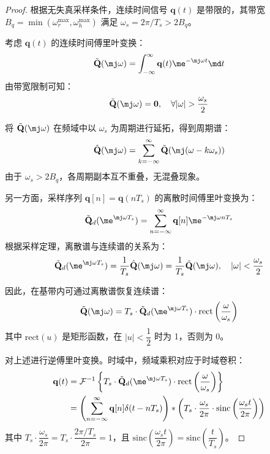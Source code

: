 \begin{proof}
    根据无失真采样条件，连续时间信号 $\mathbf{q}(t)$ 是带限的，其带宽 $B_q = \min(\omega_r^{\max}, \omega_h^{\max})$ 满足 $\omega_s = 2\pi/T_s > 2B_q$。

    考虑 $\mathbf{q}(t)$ 的连续时间傅里叶变换：
    \begin{equation}
        \tilde{\mathbf{Q}}(\mj\omega) = \int_{-\infty}^{\infty} \mathbf{q}(t) \me^{-\mj\omega t} \md t
    \end{equation}
    由带宽限制可知：
    \begin{equation}
        \tilde{\mathbf{Q}}(\mj\omega) = \mathbf{0}, \quad \forall |\omega| > \dfrac{\omega_s}{2}
    \end{equation}

    将 $\tilde{\mathbf{Q}}(\mj\omega)$ 在频域中以 $\omega_s$ 为周期进行延拓，得到周期谱：
    \begin{equation}
        \hat{\mathbf{Q}}(\mj\omega) = \sum_{k=-\infty}^{\infty} \tilde{\mathbf{Q}}(\mj(\omega - k \omega_s))
    \end{equation}
    由于 $\omega_s > 2B_q$，各周期副本互不重叠，无混叠现象。

    另一方面，采样序列 $\mathbf{q}[n] = \mathbf{q}(nT_s)$ 的离散时间傅里叶变换为：
    \begin{equation}
        \tilde{\mathbf{Q}}_d(\me^{\mj\omega T_s}) = \sum_{n=-\infty}^{\infty} \mathbf{q}[n] \me^{-\mj\omega nT_s}
    \end{equation}
    根据采样定理，离散谱与连续谱的关系为：
    \begin{equation}
        \tilde{\mathbf{Q}}_d(\me^{\mj\omega T_s}) = \dfrac{1}{T_s} \hat{\mathbf{Q}}(\mj\omega) = \dfrac{1}{T_s} \tilde{\mathbf{Q}}(\mj\omega), \quad |\omega| < \dfrac{\omega_s}{2}
    \end{equation}

    因此，在基带内可通过离散谱恢复连续谱：
    \begin{equation}
        \tilde{\mathbf{Q}}(\mj\omega) = T_s \cdot \tilde{\mathbf{Q}}_d(\me^{\mj\omega T_s}) \cdot \mathrm{rect}\left(\dfrac{\omega}{\omega_s}\right)
    \end{equation}
    其中 $\mathrm{rect}(u)$ 是矩形函数，在 $|u| < \dfrac{1}{2}$ 时为 1，否则为 0。

    对上述进行逆傅里叶变换。时域中，频域乘积对应于时域卷积：
    \begin{align*}
        \mathbf{q}(t) & = \mathcal{F}^{-1} \left\{ T_s \cdot \tilde{\mathbf{Q}}_d(\me^{\mj\omega T_s}) \cdot \mathrm{rect}\left(\dfrac{\omega}{\omega_s}\right) \right\}                             \\
                      & = \left( \sum_{n=-\infty}^{\infty} \mathbf{q}[n] \delta(t - nT_s) \right) * \left( T_s \cdot \dfrac{\omega_s}{2\pi} \cdot \text{sinc}\left(\dfrac{\omega_s t}{2\pi}\right) \right)
    \end{align*}
    其中 $T_s \cdot \dfrac{\omega_s}{2\pi} = T_s \cdot \dfrac{2\pi/T_s}{2\pi} = 1$，且 $\text{sinc}\left(\dfrac{\omega_s t}{2\pi}\right) = \text{sinc}\left(\dfrac{t}{T_s}\right)$。


\end{proof}
